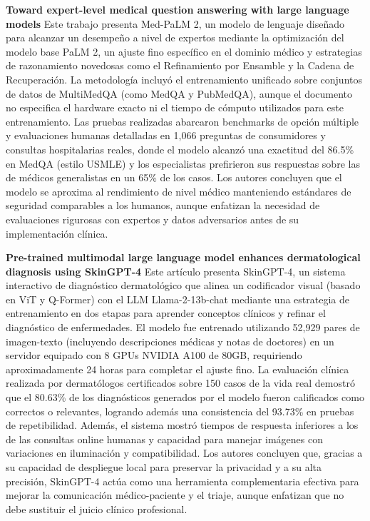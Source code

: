 \documentclass[11pt, a4paper]{article}
\begin{document}
\textbf{Toward expert-level medical question answering with large language models} \cite{singhal_toward_2025}
Este trabajo presenta Med-PaLM 2, un modelo de lenguaje diseñado para alcanzar un desempeño a nivel de expertos mediante la optimización del modelo base PaLM 2, un ajuste fino específico en el dominio médico y estrategias de 
razonamiento novedosas como el Refinamiento por Ensamble y la Cadena de Recuperación. La metodología incluyó el entrenamiento unificado sobre conjuntos de datos de MultiMedQA (como MedQA y PubMedQA), aunque el documento no especifica
el hardware exacto ni el tiempo de cómputo utilizados para este entrenamiento. Las pruebas realizadas abarcaron benchmarks de opción múltiple y evaluaciones humanas detalladas en 1,066 preguntas de consumidores y consultas hospitalarias
reales, donde el modelo alcanzó una exactitud del 86.5\% en MedQA (estilo USMLE) y los especialistas prefirieron sus respuestas sobre las de médicos generalistas en un 65\% de los casos. Los autores concluyen que el modelo se aproxima al
rendimiento de nivel médico manteniendo estándares de seguridad comparables a los humanos, aunque enfatizan la necesidad de evaluaciones rigurosas con expertos y datos adversarios antes de su implementación clínica.

\textbf{Pre-trained multimodal large language model enhances dermatological diagnosis using SkinGPT-4} \cite{zhou_pre-trained_2024}
Este artículo presenta SkinGPT-4, un sistema interactivo de diagnóstico dermatológico que alinea un codificador visual (basado en ViT y Q-Former) con el LLM Llama-2-13b-chat mediante una estrategia de entrenamiento en dos etapas para
aprender conceptos clínicos y refinar el diagnóstico de enfermedades. El modelo fue entrenado utilizando 52,929 pares de imagen-texto (incluyendo descripciones médicas y notas de doctores) en un servidor equipado con 8 GPUs NVIDIA A100
de 80GB, requiriendo aproximadamente 24 horas para completar el ajuste fino. La evaluación clínica realizada por dermatólogos certificados sobre 150 casos de la vida real demostró que el 80.63\% de los diagnósticos generados por el modelo
fueron calificados como correctos o relevantes, logrando además una consistencia del 93.73\% en pruebas de repetibilidad. Además, el sistema mostró tiempos de respuesta inferiores a los de las consultas online humanas y capacidad para
manejar imágenes con variaciones en iluminación y compatibilidad. Los autores concluyen que, gracias a su capacidad de despliegue local para preservar la privacidad y a su alta precisión, SkinGPT-4 actúa como una herramienta complementaria
efectiva para mejorar la comunicación médico-paciente y el triaje, aunque enfatizan que no debe sustituir el juicio clínico profesional.
\end{document}

